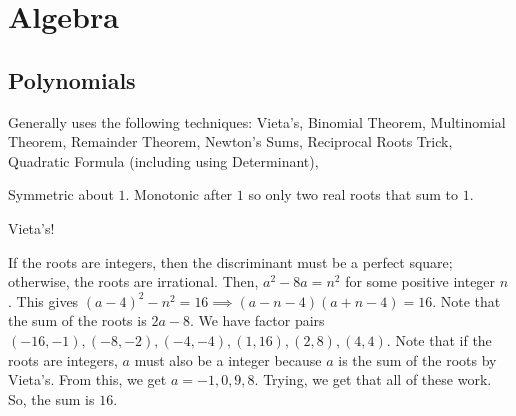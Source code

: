 \documentclass[11pt]{article}
\begin{document}
\setcounter{problem}{0}
\section{Algebra}

\subsection{Polynomials}
Generally uses the following techniques: Vieta's, Binomial Theorem, Multinomial Theorem, Remainder Theorem, Newton's Sums, Reciprocal Roots Trick, Quadratic Formula (including using Determinant), 





\begin{sol} 
Symmetric about $1$. Monotonic after $1$ so only two real roots that sum to $1$.
\end{sol}


\begin{sol}
Vieta's! 
\end{sol}


\begin{sol}
If the roots are integers, then the discriminant must be a perfect square; otherwise, the roots are irrational. Then, $a^2-8a=n^2$ for some positive integer $n$. This gives $(a-4)^2-n^2=16\implies (a-n-4)(a+n-4)=16$. Note that the sum of the roots is $2a-8$. We have factor pairs $(-16,-1),(-8,-2),(-4,-4),(1,16),(2,8),(4,4)$. Note that if the roots are integers, $a$ must also be a integer because $a$ is the sum of the roots by Vieta's. From this, we get $a=-1, 0, 9, 8$. Trying, we get that all of these work. So, the sum is $\boxed{16}$.
\end{sol}
\end{document}
